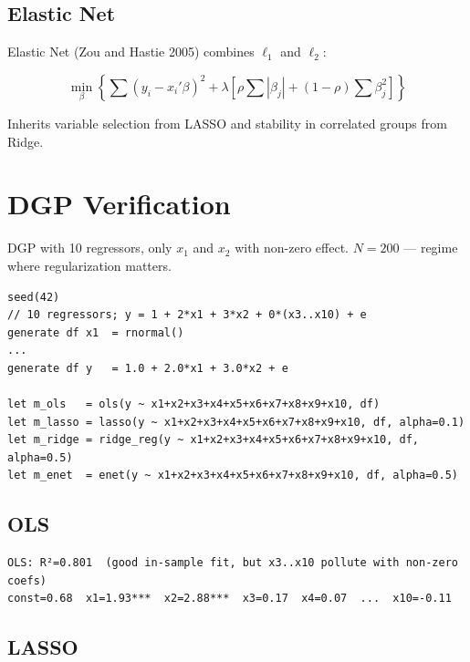 \subsection*{Elastic Net}

Elastic Net (Zou and Hastie 2005) combines $\ell_1$ and $\ell_2$:

\[
  \min_\beta \left\{ \sum(y_i - x_i'\beta)^2
  + \lambda \left[\rho\sum|\beta_j| + (1-\rho)\sum\beta_j^2\right] \right\}
\]

Inherits variable selection from LASSO and stability in correlated groups
from Ridge.

\section{DGP Verification}

DGP with 10 regressors, only $x_1$ and $x_2$ with non-zero effect.
$N = 200$ — regime where regularization matters.

\begin{lstlisting}[caption={Sparse DGP — 2 of 10 active variables}]
seed(42)
// 10 regressors; y = 1 + 2*x1 + 3*x2 + 0*(x3..x10) + e
generate df x1  = rnormal()
...
generate df y   = 1.0 + 2.0*x1 + 3.0*x2 + e

let m_ols   = ols(y ~ x1+x2+x3+x4+x5+x6+x7+x8+x9+x10, df)
let m_lasso = lasso(y ~ x1+x2+x3+x4+x5+x6+x7+x8+x9+x10, df, alpha=0.1)
let m_ridge = ridge_reg(y ~ x1+x2+x3+x4+x5+x6+x7+x8+x9+x10, df, alpha=0.5)
let m_enet  = enet(y ~ x1+x2+x3+x4+x5+x6+x7+x8+x9+x10, df, alpha=0.5)
\end{lstlisting}

\subsection*{OLS}

\begin{lstlisting}[language={}, basicstyle=\ttfamily\small,
  frame=none, numbers=none, backgroundcolor=\color{codbg},
  xleftmargin=0pt, xrightmargin=0pt, breaklines=false]
OLS: R²=0.801  (good in-sample fit, but x3..x10 pollute with non-zero coefs)
const=0.68  x1=1.93***  x2=2.88***  x3=0.17  x4=0.07  ...  x10=-0.11
\end{lstlisting}

\subsection*{LASSO}

